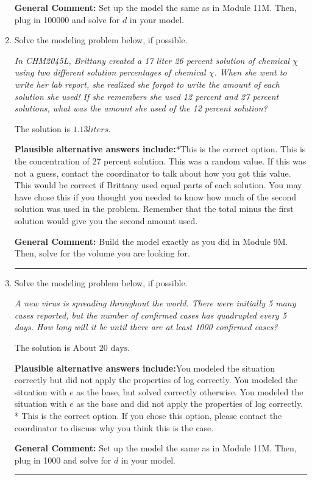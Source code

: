 \documentclass{extbook}[14pt]
\newcommand{\litem}[1]{\item #1

\rule{\textwidth}{0.4pt}}
\begin{document}
\begin{enumerate}
{\textbf{General Comment:} Set up the model the same as in Module 11M. Then, plug in 100000 and solve for $d$ in your model.
}
\litem{
Solve the modeling problem below, if possible.

\begin{center}
    \textit{ In CHM2045L, Brittany created a 17 liter 26 percent solution of chemical $\chi$ using two different solution percentages of chemical $\chi$. When she went to write her lab report, she realized she forgot to write the amount of each solution she used! If she remembers she used 12 percent and 27 percent solutions, what was the amount she used of the 12 percent solution? }
\end{center}
The solution is \( 1.13 liters \).\begin{enumerate}[label=\Alph*.]
\textbf{Plausible alternative answers include:}*This is the correct option.
This is the concentration of 27 percent solution.
This was a random value. If this was not a guess, contact the coordinator to talk about how you got this value.
This would be correct if Brittany used equal parts of each solution.
You may have chose this if you thought you needed to know how much of the second solution was used in the problem. Remember that the total minus the first solution would give you the second amount used.
\end{enumerate}

\textbf{General Comment:} Build the model exactly as you did in Module 9M. Then, solve for the volume you are looking for.
}
\litem{
Solve the modeling problem below, if possible.

\begin{center}
    \textit{ A new virus is spreading throughout the world. There were initially 5 many cases reported, but the number of confirmed cases has quadrupled every 5 days. How long will it be until there are at least 1000 confirmed cases? }
\end{center}
The solution is \( \text{About } 20 \text{ days} \).\begin{enumerate}[label=\Alph*.]
\textbf{Plausible alternative answers include:}You modeled the situation correctly but did not apply the properties of log correctly.
You modeled the situation with $e$ as the base, but solved correctly otherwise.
You modeled the situation with $e$ as the base and did not apply the properties of log correctly.
* This is the correct option.
If you chose this option, please contact the coordinator to discuss why you think this is the case.
\end{enumerate}

\textbf{General Comment:} Set up the model the same as in Module 11M. Then, plug in 1000 and solve for $d$ in your model.
}
\end{enumerate}
\end{document}
